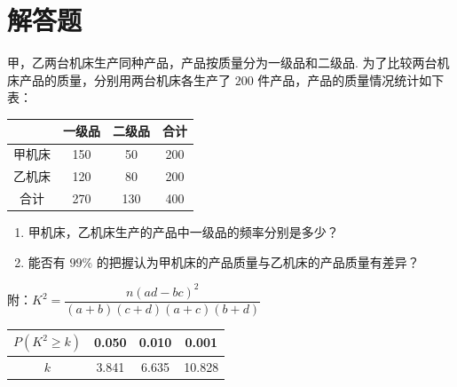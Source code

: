 \section{解答题}

\begin{problem}
甲，乙两台机床生产同种产品，产品按质量分为一级品和二级品. 为了比较两台机床产品的质量，分别用两台机床各生产了 \(200\) 件产品，产品的质量情况统计如下表：

\begin{center}
\begin{tabular}{|c|c|c|c|}
\hline
 & 一级品 & 二级品 & 合计 \\
\hline
甲机床 & 150 & 50 & 200 \\
\hline
乙机床 & 120 & 80 & 200 \\
\hline
合计 & 270 & 130 & 400 \\
\hline
\end{tabular}
\end{center}

\begin{enumerate}
\item 甲机床，乙机床生产的产品中一级品的频率分别是多少？
\item 能否有 \(99\%\) 的把握认为甲机床的产品质量与乙机床的产品质量有差异？
\end{enumerate}

附：\(K^2=\dfrac{n(ad-bc)^2}{(a+b)(c+d)(a+c)(b+d)}\)

\begin{center}
\begin{tabular}{|c|c|c|c|}
\hline
\(P(K^2\ge k)\) & 0.050 & 0.010 & 0.001 \\
\hline
\(k\) & 3.841 & 6.635 & 10.828 \\
\hline
\end{tabular}
\end{center}
\end{problem}


